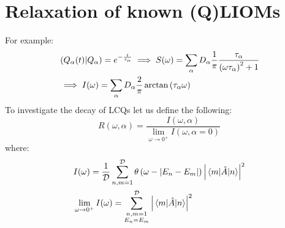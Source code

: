 \section{Relaxation of known (Q)LIOMs}



  For example:
  \begin{align*}
    &\left(Q_{\alpha}(t) \middle| Q_{\alpha}\right) = e^{-\frac{t}{\tau_{\alpha}}} \implies 
    S(\omega) = \sum_{\alpha} D_{\alpha} \frac{1}{\pi}\frac{\tau_{\alpha}}{{\left(\omega \tau_{\alpha}\right)}^2 + 1}\\
    &\implies I(\omega) = \sum_{\alpha}D_{\alpha}\frac{2}{\pi} \arctan{(\tau_{\alpha}  \omega )}
  \end{align*}
To investigate the decay of LCQs let us define the following:
\begin{equation*}
  R(\omega,\alpha) = \frac{I(\omega,\alpha)}{\lim_{\omega \to 0^{+}} I(\omega,\alpha=0)} 
\end{equation*}
where:
\begin{align*}
  &I(\omega) = \frac{1}{\mathcal{D}}\sum_{n,m=1}^{\mathcal{D}}\theta\left(\omega -\abs{E_n-E_m}\right) \abs{\matrixel{m}{\hat{A}}{n}}^2\\
  &\lim_{\omega \to 0^{+}} I(\omega) = \sum_{\substack{n,m=1 \\ E_n=E_m}}^{\mathcal{D}} \abs{\matrixel{m}{\hat{A}}{n}}^2
\end{align*}  
